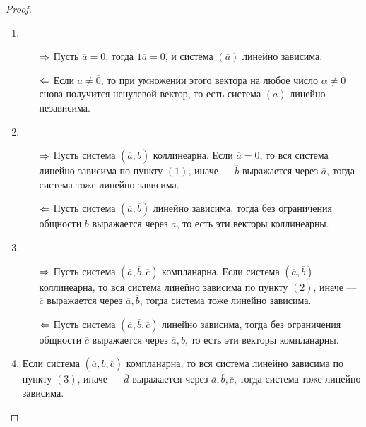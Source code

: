 \begin{proof}~
	\begin{enumerate}
		\item\begin{itemize}
				\item[$\Rightarrow$] Пусть $\overline{a} = \overline{0}$, тогда $1\overline{a} = \overline{0}$, и система $(\overline{a})$ линейно зависима.
				\item[$\Leftarrow$]Если $\overline{a} \ne \overline{0}$, то при умножении этого вектора на любое число $\alpha \ne 0$ снова получится ненулевой вектор, то есть система $(\overline{a})$ линейно независима.
			\end{itemize}
		\item\begin{itemize}
			\item[$\Rightarrow$] Пусть система $(\overline{a}, \overline{b})$ коллинеарна. Если $\overline{a} = \overline{0}$, то вся система линейно зависима по пункту $(1)$, иначе --- $\overline{b}$ выражается через $\overline{a}$, тогда система тоже линейно зависима.
			\item[$\Leftarrow$] Пусть система $(\overline{a}, \overline{b})$ линейно зависима, тогда без ограничения общности $\overline{b}$ выражается через $\overline{a}$, то есть эти векторы коллинеарны.
		\end{itemize}
	
		\item\begin{itemize}
			\item[$\Rightarrow$] Пусть система $(\overline{a}, \overline{b}, \overline{c})$ компланарна. Если система $(\overline{a}, \overline{b})$ коллинеарна, то вся система линейно зависима по пункту $(2)$, иначе --- $\overline{c}$ выражается через  $\overline{a}, \overline{b}$, тогда система тоже линейно зависима.
			\item[$\Leftarrow$]Пусть система $(\overline{a}, \overline{b}, \overline{c})$ линейно зависима, тогда без ограничения общности $\overline{c}$ выражается через $\overline{a}, \overline{b}$, то есть эти векторы компланарны.\qedhere
		\end{itemize}
	
		\item Если система $(\overline{a}, \overline{b}, \overline{c})$ компланарна, то вся система линейно зависима по пункту $(3)$, иначе --- $\overline{d}$ выражается через $\overline{a}, \overline{b}, \overline{c}$, тогда система тоже линейно зависима.
	\end{enumerate}
\end{proof}


